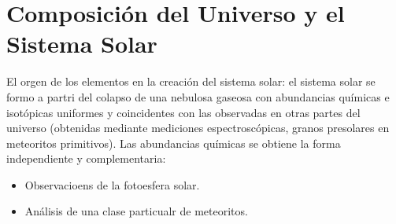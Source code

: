 \section{Composición del Universo y el Sistema Solar}

El orgen de los elementos en la creación del sistema solar: el sistema solar se formo a partri del colapso de una nebulosa gaseosa con abundancias químicas e isotópicas uniformes y coincidentes con las observadas en otras partes del universo (obtenidas mediante mediciones espectroscópicas, granos presolares en meteoritos primitivos). Las abundancias químicas se obtiene la forma independiente y complementaria:

\begin{itemize}
    \item Observacioens de la fotoesfera solar.
    \item Análisis de una clase particualr de meteoritos.
\end{itemize}


